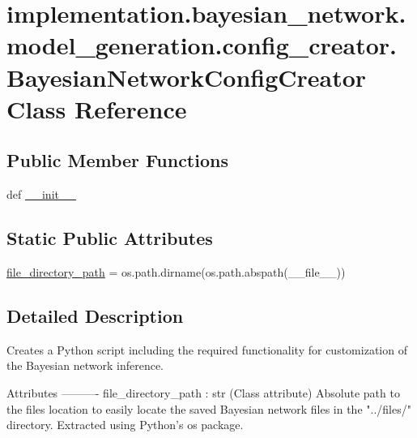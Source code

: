 \hypertarget{classimplementation_1_1bayesian__network_1_1model__generation_1_1config__creator_1_1_bayesian_network_config_creator}{}\section{implementation.\+bayesian\+\_\+network.\+model\+\_\+generation.\+config\+\_\+creator.\+Bayesian\+Network\+Config\+Creator Class Reference}
\label{classimplementation_1_1bayesian__network_1_1model__generation_1_1config__creator_1_1_bayesian_network_config_creator}
\subsection*{Public Member Functions}
\begin{DoxyCompactItemize}
\item 
def \hyperlink{classimplementation_1_1bayesian__network_1_1model__generation_1_1config__creator_1_1_bayesian_network_config_creator_aa74a50c9c6d62e840a276fa5d0b78475}{\+\_\+\+\_\+init\+\_\+\+\_\+}
\end{DoxyCompactItemize}
\subsection*{Static Public Attributes}
\begin{DoxyCompactItemize}
\item 
\hyperlink{classimplementation_1_1bayesian__network_1_1model__generation_1_1config__creator_1_1_bayesian_network_config_creator_ab51c4e1f447276c2a755e642e0a6d425}{file\+\_\+directory\+\_\+path} = os.\+path.\+dirname(os.\+path.\+abspath(\+\_\+\+\_\+file\+\_\+\+\_\+))
\end{DoxyCompactItemize}


\subsection{Detailed Description}
\begin{DoxyVerb}Creates a Python script including the required functionality for customization of the Bayesian network inference.

Attributes
----------
file_directory_path : str
    (Class attribute) Absolute path to the files location to easily locate the saved Bayesian network files in the
    "../files/" directory. Extracted using Python's os package.
\end{DoxyVerb}
 

